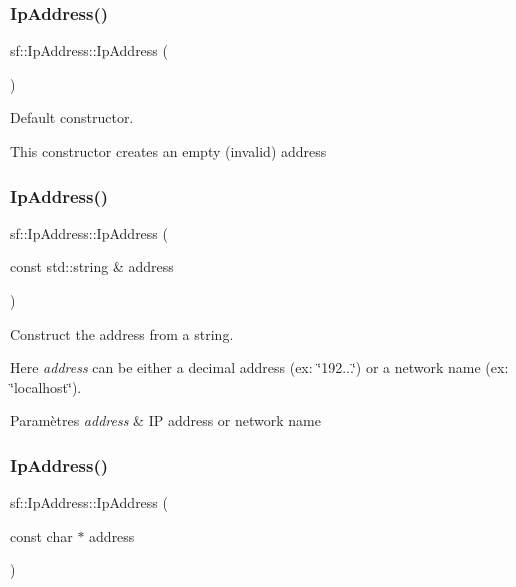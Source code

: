 \subsubsection{\texorpdfstring{Ip\+Address()}{IpAddress()}\hspace{0.1cm}{\footnotesize\ttfamily [1/5]}}
{\footnotesize\ttfamily sf\+::\+Ip\+Address\+::\+Ip\+Address (\begin{DoxyParamCaption}{ }\end{DoxyParamCaption})}



Default constructor. 

This constructor creates an empty (invalid) address \mbox{\label{classsf_1_1IpAddress_a656b7445ab04cabaa7398685bc09c3f7}} 
\subsubsection{\texorpdfstring{Ip\+Address()}{IpAddress()}\hspace{0.1cm}{\footnotesize\ttfamily [2/5]}}
{\footnotesize\ttfamily sf\+::\+Ip\+Address\+::\+Ip\+Address (\begin{DoxyParamCaption}\item[{const std\+::string \&}]{address }\end{DoxyParamCaption})}



Construct the address from a string. 

Here {\itshape address} can be either a decimal address (ex\+: \char`\"{}192...\char`\"{}) or a network name (ex\+: \char`\"{}localhost\char`\"{}).


\begin{DoxyParams}{Paramètres}
{\em address} & IP address or network name \\
\hline
\end{DoxyParams}
\mbox{\label{classsf_1_1IpAddress_a92f2a9be74334a61b96c2fc79fe6eb78}} 
\subsubsection{\texorpdfstring{Ip\+Address()}{IpAddress()}\hspace{0.1cm}{\footnotesize\ttfamily [3/5]}}
{\footnotesize\ttfamily sf\+::\+Ip\+Address\+::\+Ip\+Address (\begin{DoxyParamCaption}\item[{const char $\ast$}]{address }\end{DoxyParamCaption})}



